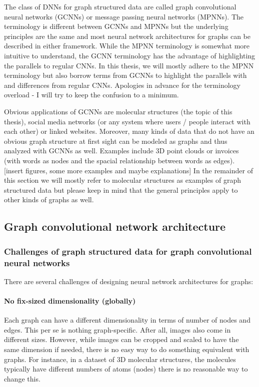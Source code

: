 The class of DNNs for graph structured data are called graph convolutional neural networks (GCNNs) or message passing neural networks (MPNNs). The terminology is different between GCNNs and MPNNs but the underlying principles are the same and most neural network architectures for graphs can be described in either framework. While the MPNN terminology is somewhat more intuitive to understand, the GCNN terminology has the advantage of highlighting the parallels to regular CNNs. In this thesis, we will mostly adhere to the MPNN terminology but also borrow terms from GCNNs to highlight the parallels with and differences from regular CNNs. Apologies in advance for the terminology overload - I will try to keep the confusion to a minimum.

Obvious applications of GCNNs are molecular structures (the topic of this thesis), social media networks (or any system where users / people interact with each other) or linked websites. Moreover, many kinds of data that do not have an obvious graph structure at first sight can be modeled as graphs and thus analyzed with GCNNs as well. Examples include 3D point clouds or invoices (with words as nodes and the spacial relationship between words as edges).
[insert figures, some more examples and maybe explanations]
In the remainder of this section we will mostly refer to molecular structures as examples of graph structured data but please keep in mind that the general principles apply to other kinds of graphs as well.

\subsection{Graph convolutional network architecture}

\subsubsection{Challenges of graph structured data for graph convolutional neural networks}

There are several challenges of designing neural network architectures for graphs:

\paragraph{No fix-sized dimensionality (globally)}
Each graph can have a different dimensionality in terms of number of nodes and edges. This per se is nothing graph-specific. After all, images also come in different sizes. However, while images can be cropped and scaled to have the same dimension if needed, there is no easy way to do something equivalent with graphs. For instance, in a dataset of 3D molecular structures, the molecules typically have different numbers of atoms (nodes) there is no reasonable way to change this.
